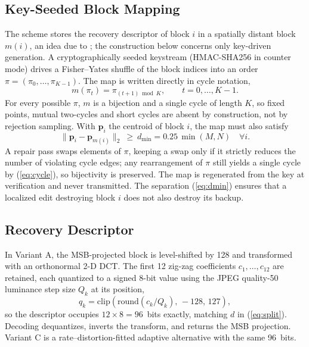 \documentclass[conference]{IEEEtran}
\begin{document}
\subsection{Key-Seeded Block Mapping}
\label{ssec:map}
The scheme stores the recovery descriptor of block $i$ in a spatially distant block $m(i)$, an idea due to \cite{ausr3}; the construction below concerns only key-driven generation. A cryptographically seeded keystream (HMAC-SHA256 in counter mode) drives a Fisher--Yates shuffle of the block indices into an order $\pi=(\pi_0,\dots,\pi_{K-1})$. The map is written directly in cycle notation,
\begin{equation}
m(\pi_t)=\pi_{(t+1)\bmod K},\qquad t=0,\dots,K-1.
\label{eq:cycle}
\end{equation}
For every possible $\pi$, $m$ is a bijection and a single cycle of length $K$, so fixed points, mutual two-cycles and short cycles are absent by construction, not by rejection sampling. With $\mathbf{p}_i$ the centroid of block $i$, the map must also satisfy
\begin{equation}
\lVert\mathbf{p}_i-\mathbf{p}_{m(i)}\rVert_2\ \ge\ d_{\min}=0.25\,\min(M,N)\quad\forall i.
\label{eq:dmin}
\end{equation}
A repair pass swaps elements of $\pi$, keeping a swap only if it strictly reduces the number of violating cycle edges; any rearrangement of $\pi$ still yields a single cycle by (\ref{eq:cycle}), so bijectivity is preserved. The map is regenerated from the key at verification and never transmitted. The separation (\ref{eq:dmin}) ensures that a localized edit destroying block $i$ does not also destroy its backup.

\subsection{Recovery Descriptor}
\label{ssec:desc}
In Variant A, the MSB-projected block is level-shifted by 128 and transformed with an orthonormal 2-D DCT. The first 12 zig-zag coefficients $c_1,\dots,c_{12}$ are retained, each quantized to a signed 8-bit value using the JPEG quality-50 luminance step size $Q_k$ at its position,
\begin{equation}
q_k=\mathrm{clip}\!\left(\mathrm{round}(c_k/Q_k),\,-128,\,127\right),
\label{eq:quant}
\end{equation}
so the descriptor occupies $12\times 8=96$~bits exactly, matching $d$ in (\ref{eq:split}). Decoding dequantizes, inverts the transform, and returns the MSB projection. Variant C is a rate--distortion-fitted adaptive alternative with the same 96~bits.
\end{document}
